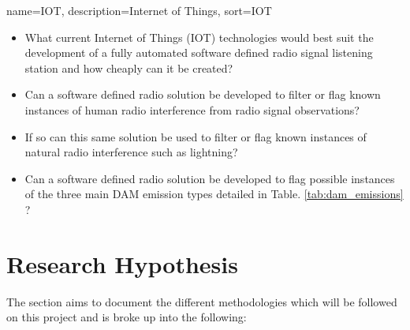 \documentclass[runningheads,a4paper]{llncs}
\begin{document}
%
{
  name={IOT},
  description={Internet of Things},
  sort=IOT
}
%

\begin{itemize}
  \item What current Internet of Things (\gls{IOT}) technologies would best suit the development of a fully automated software defined radio signal listening station and how cheaply can it be created?
  \item Can a software defined radio solution be developed to filter or flag known instances of human radio interference from radio signal observations?
  \item If so can this same solution be used to filter or flag known instances of natural radio interference such as lightning?
  \item Can a software defined radio solution be developed to flag possible instances of the three main \gls{DAM} emission types detailed in Table. \ref{tab:dam_emissions} ?
\end{itemize}

%
%
\newpage
\section*{Research Hypothesis}

The section aims to document the different methodologies which will be followed on this project and is broke up into the following:
\end{document}
